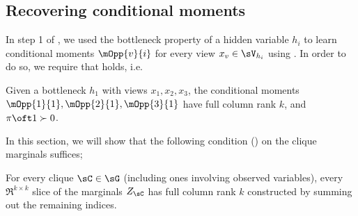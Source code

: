 \subsection{Recovering conditional moments}

In step 1 of \LearnMarginals, we used the bottleneck property of a hidden
  variable $h_i$ to learn conditional moments $\mOpp{v}{i}$ for every
  view $x_v \in \sV_{h_i}$ using \TensorFactorize. 
In order to do so, we require that  holds, i.e.
\begin{assumption*}[1]
  Given a bottleneck $h_1$ with views $x_1, x_2, x_3$, the conditional
  moments $\mOpp{1}{1}, \mOpp{2}{1}, \mOpp{3}{1}$ have full column rank
  $k$, and $\pi\oft 1 \succ 0$.
\end{assumption*}

In this section, we will show that the following condition
  () on the clique marginals suffices;
\begin{assumption*}[2]
For every clique $\sC \in \sG$ (including ones involving observed variables),
  every $\Re^{k \times k}$ slice of the marginals $Z_\sC$ has full column
  rank $k$ constructed by summing out the remaining indices.
\end{assumption*}

%
%
%
%
%

